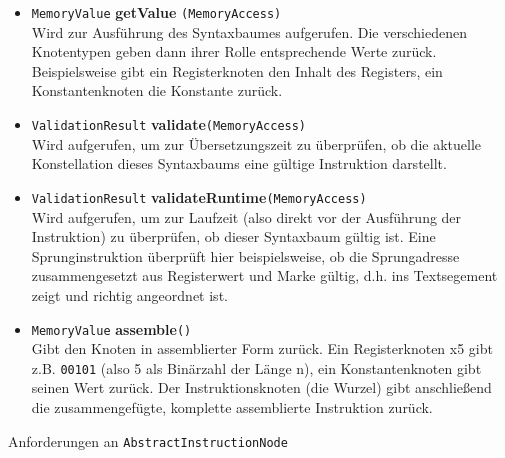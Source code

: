 \begin{itemize}
	\item \texttt{MemoryValue} \textbf{getValue} \texttt{(MemoryAccess)} \\
	Wird zur Ausführung des Syntaxbaumes aufgerufen. Die verschiedenen Knotentypen geben dann ihrer Rolle entsprechende Werte zurück. Beispielsweise gibt ein Registerknoten den Inhalt des Registers, ein Konstantenknoten die Konstante zurück.
	\item \texttt{ValidationResult} \textbf{validate}\texttt{(MemoryAccess)} \\
	Wird aufgerufen, um zur Übersetzungszeit zu überprüfen, ob die aktuelle Konstellation dieses Syntaxbaums eine gültige Instruktion darstellt.
	\item \texttt{ValidationResult} \textbf{validateRuntime}\texttt{(MemoryAccess)} \\
	Wird aufgerufen, um zur Laufzeit (also direkt vor der Ausführung der Instruktion) zu überprüfen, ob dieser Syntaxbaum gültig ist. Eine Sprunginstruktion überprüft hier beispielsweise, ob die Sprungadresse zusammengesetzt aus Registerwert und Marke gültig, d.h. ins Textsegement zeigt und richtig angeordnet ist.
	\item \texttt{MemoryValue} \textbf{assemble}\texttt{()} \\
	Gibt den Knoten in assemblierter Form zurück. Ein Registerknoten x5 gibt z.B. \texttt{00101} (also 5 als Binärzahl der Länge n), ein Konstantenknoten gibt seinen Wert zurück. Der Instruktionsknoten (die Wurzel) gibt anschließend die zusammengefügte, komplette assemblierte Instruktion zurück.
\end{itemize}

Anforderungen an \texttt{AbstractInstructionNode}


